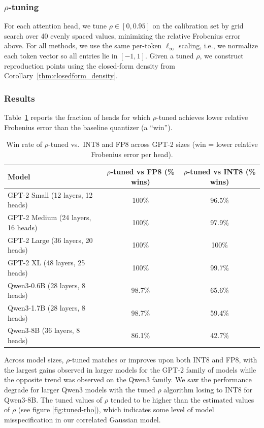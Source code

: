 \documentclass{article}
\begin{document}
\subsubsection{$\rho$-tuning}
For each attention head, we tune $\rho \in [0, 0.95]$ on the calibration set by grid search over 40 evenly spaced values, minimizing the relative Frobenius error above. For all methods, we use the same per-token $\ell_\infty$ scaling, i.e., we normalize each token vector so all entries lie in $[-1,1]$. Given a tuned $\rho$, we construct reproduction points using the closed-form density from Corollary~\ref{thm:closedform_density}.

\subsubsection{Results}
Table~\ref{tab:rho_tuned_wins} reports the fraction of heads for which $\rho$-tuned achieves lower relative Frobenius error than the baseline quantizer (a ``win'').

\begin{table}[t]
\centering
\caption{Win rate of $\rho$-tuned vs.\ INT8 and FP8 across GPT-2 sizes (win = lower relative Frobenius error per head).}
\label{tab:rho_tuned_wins}
\begin{tabular}{lcc}
\toprule
Model & $\rho$-tuned vs FP8 (\% wins) & $\rho$-tuned vs INT8 (\% wins) \\
\midrule
GPT-2 Small (12 layers, 12 heads)  & 100\% & 96.5\% \\
GPT-2 Medium (24 layers, 16 heads) & 100\% & 97.9\% \\
GPT-2 Large (36 layers, 20 heads)  & 100\% & 100\% \\
GPT-2 XL (48 layers, 25 heads) & 100\% & 99.7\%\\
Qwen3-0.6B (28 layers, 8 heads) & 98.7\% & 65.6\%\\
Qwen3-1.7B (28 layers, 8 heads)& 98.7\% & 59.4\%\\
Qwen3-8B (36 layers, 8 heads)& 86.1\% & 42.7\%\\
\bottomrule
\end{tabular}
\end{table}

Across model sizes, $\rho$-tuned matches or improves upon both INT8 and FP8, with the largest gains observed in larger models for the GPT-2 family of models while the opposite trend was observed on the Qwen3 family. We saw the performance degrade for larger Qwen3 models with the tuned $\rho$ algorithm losing to INT8 for Qwen3-8B. The tuned values of $\rho$ tended to be higher than the estimated values of $\rho$ (see figure \ref{fig:tuned-rho}), which indicates some level of model misspecification in our correlated Gaussian model. 
\end{document}
